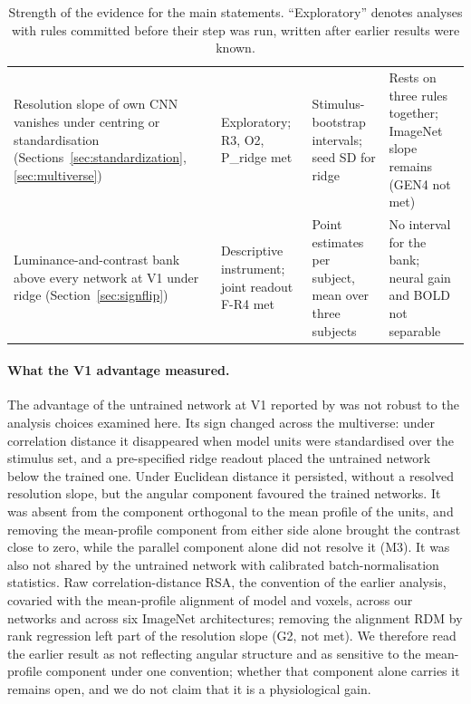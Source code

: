\begin{table}[!t]
\begin{tabular}{@{}>{\raggedright\arraybackslash}p{}>{\raggedright\arraybackslash}p{}>{\raggedright\arraybackslash}p{}>{\raggedright\arraybackslash}p{}@{}}
Resolution slope of own CNN vanishes under centring or standardisation (Sections~\ref{sec:standardization}, \ref{sec:multiverse}) & Exploratory; R3, O2, P\_ridge met & Stimulus-bootstrap intervals; seed SD for ridge & Rests on three rules together; ImageNet slope remains (GEN4 not met) \\
Luminance-and-contrast bank above every network at V1 under ridge (Section~\ref{sec:signflip}) & Descriptive instrument; joint readout F-R4 met & Point estimates per subject, mean over three subjects & No interval for the bank; neural gain and BOLD not separable \\
\bottomrule
\end{tabular}
\caption{Strength of the evidence for the main statements. ``Exploratory'' denotes analyses with rules committed before their step was run, written after earlier results were known.}
\label{tab:evidence}
\end{table}

\paragraph{What the V1 advantage measured.}
The advantage of the untrained network at V1 reported by \citet{evalres} was
not robust to the analysis choices examined here. Its sign changed across the multiverse:
under correlation distance it disappeared when model units were standardised over the
stimulus set, and a pre-specified ridge readout placed the untrained network below the
trained one. Under Euclidean distance it persisted, without a resolved resolution slope,
but the angular component favoured the trained networks. It was absent from the component
orthogonal to the mean profile of the units, and removing the mean-profile component from either side alone brought the contrast close to zero, while the parallel component alone did not resolve it (M3). It was also not shared by the untrained network with calibrated
batch-normalisation statistics. Raw correlation-distance RSA, the convention of the
earlier analysis, covaried with the mean-profile alignment of model and voxels, across our
networks and across six ImageNet architectures; removing the alignment RDM by rank
regression left part of the resolution slope (G2, not met). We therefore read the earlier result as not reflecting angular structure and as sensitive to the mean-profile component under one convention; whether that component alone carries it remains open, and we do not claim that it is a physiological gain.

